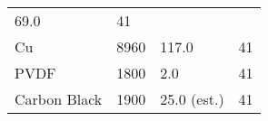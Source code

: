 \documentclass[]{article}
\begin{document}
\begin{longtable}[c]{@{}llll@{}}
\begin{minipage}[t]{0.22\columnwidth}\raggedright\strut
69.0
\strut\end{minipage} &
\begin{minipage}[t]{0.22\columnwidth}\raggedright\strut
41
\strut\end{minipage}\tabularnewline
\begin{minipage}[t]{0.22\columnwidth}\raggedright\strut
Cu
\strut\end{minipage} &
\begin{minipage}[t]{0.22\columnwidth}\raggedright\strut
8960
\strut\end{minipage} &
\begin{minipage}[t]{0.22\columnwidth}\raggedright\strut
117.0
\strut\end{minipage} &
\begin{minipage}[t]{0.22\columnwidth}\raggedright\strut
41
\strut\end{minipage}\tabularnewline
\begin{minipage}[t]{0.22\columnwidth}\raggedright\strut
PVDF
\strut\end{minipage} &
\begin{minipage}[t]{0.22\columnwidth}\raggedright\strut
1800
\strut\end{minipage} &
\begin{minipage}[t]{0.22\columnwidth}\raggedright\strut
2.0
\strut\end{minipage} &
\begin{minipage}[t]{0.22\columnwidth}\raggedright\strut
41
\strut\end{minipage}\tabularnewline
\begin{minipage}[t]{0.22\columnwidth}\raggedright\strut
Carbon Black
\strut\end{minipage} &
\begin{minipage}[t]{0.22\columnwidth}\raggedright\strut
1900
\strut\end{minipage} &
\begin{minipage}[t]{0.22\columnwidth}\raggedright\strut
25.0 (est.)
\strut\end{minipage} &
\begin{minipage}[t]{0.22\columnwidth}\raggedright\strut
41
\strut\end{minipage}\tabularnewline
\bottomrule
\end{longtable}
\end{document}
